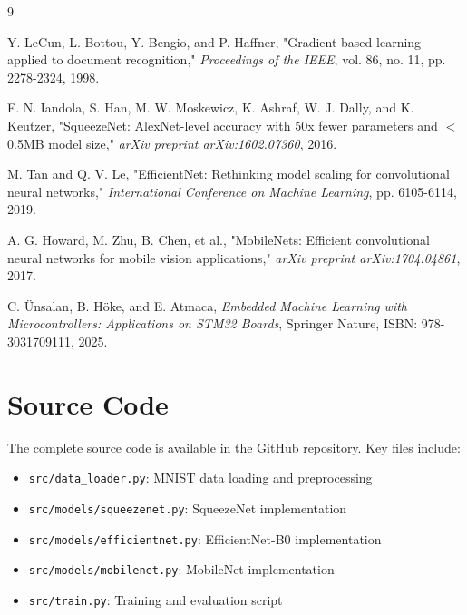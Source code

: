 \documentclass[12pt,a4paper]{article}
\begin{document}
\begin{thebibliography}{9}

Y. LeCun, L. Bottou, Y. Bengio, and P. Haffner, "Gradient-based learning applied to document recognition," \textit{Proceedings of the IEEE}, vol. 86, no. 11, pp. 2278-2324, 1998.

F. N. Iandola, S. Han, M. W. Moskewicz, K. Ashraf, W. J. Dally, and K. Keutzer, "SqueezeNet: AlexNet-level accuracy with 50x fewer parameters and $<$0.5MB model size," \textit{arXiv preprint arXiv:1602.07360}, 2016.

M. Tan and Q. V. Le, "EfficientNet: Rethinking model scaling for convolutional neural networks," \textit{International Conference on Machine Learning}, pp. 6105-6114, 2019.

A. G. Howard, M. Zhu, B. Chen, et al., "MobileNets: Efficient convolutional neural networks for mobile vision applications," \textit{arXiv preprint arXiv:1704.04861}, 2017.

C. Ünsalan, B. Höke, and E. Atmaca, \textit{Embedded Machine Learning with Microcontrollers: Applications on STM32 Boards}, Springer Nature, ISBN: 978-3031709111, 2025.

\end{thebibliography}

\appendix
\section{Source Code}

The complete source code is available in the GitHub repository. Key files include:

\begin{itemize}
    \item \texttt{src/data\_loader.py}: MNIST data loading and preprocessing
    \item \texttt{src/models/squeezenet.py}: SqueezeNet implementation
    \item \texttt{src/models/efficientnet.py}: EfficientNet-B0 implementation
    \item \texttt{src/models/mobilenet.py}: MobileNet implementation
    \item \texttt{src/train.py}: Training and evaluation script
\end{itemize}
\end{document}
